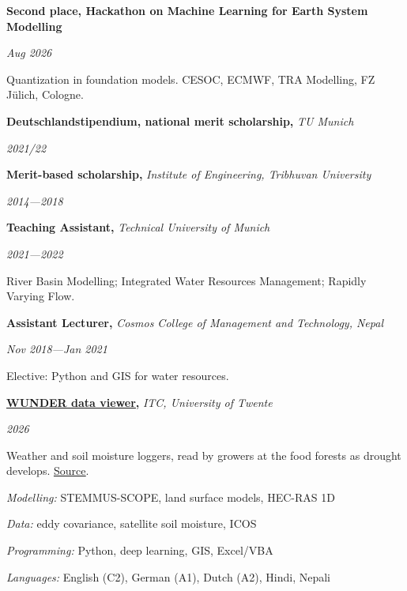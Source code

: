\documentclass[10pt,letterpaper]{article}
\newcommand{\ulink}[2]{\href{#1}{\uline{#2}}}
\newlength{\cvlabelwidth}
\newenvironment{cvsection}[1]{%
  \begin{list}{}{%
    \setlength{\leftmargin}{\cvlabelwidth}%
    \addtolength{\leftmargin}{0.12in}%
    \setlength{\labelwidth}{\cvlabelwidth}%
    \setlength{\labelsep}{0.12in}%
    \setlength{\itemindent}{0pt}%
    \setlength{\listparindent}{0pt}%
    \setlength{\topsep}{0.028in}%
    \setlength{\parsep}{0pt}%
    \setlength{\itemsep}{0pt}%
    \renewcommand{\makelabel}[1]{%
      \smash{\parbox[t]{\cvlabelwidth}{\raggedright\textsc{##1}}}}%
  }%
  \item[#1]%
}{\end{list}}
\newcommand{\entry}[3]{%
  \noindent
  \begin{minipage}[t]{0.72\linewidth}\raggedright\textbf{#1}\textit{#2}\end{minipage}%
  \hfill
  \begin{minipage}[t]{0.26\linewidth}\raggedleft\textit{#3}\end{minipage}%
  \par
}
\newcommand{\detail}[1]{%
  \hspace*{0.55em}\textendash\hspace{0.4em}%
  \parbox[t]{\dimexpr\linewidth-1.75em}{\raggedright #1}\par}
\newcommand{\gap}{\vspace{0.025in}}
\begin{document}
\begin{cvsection}{Awards}
  \entry{Second place, Hackathon on Machine Learning for Earth System Modelling}{}{Aug 2026}
  \detail{Quantization in foundation models. CESOC, ECMWF, TRA Modelling, FZ Jülich, Cologne.}
\end{cvsection}

\begin{cvsection}{Scholarships}
  \entry{Deutschlandstipendium, national merit scholarship, }{TU Munich}{2021/22}
  \gap
  \entry{Merit-based scholarship, }{Institute of Engineering, Tribhuvan University}{2014---2018}
\end{cvsection}

\begin{cvsection}{Teaching}
  \entry{Teaching Assistant, }{Technical University of Munich}{2021---2022}
  \detail{River Basin Modelling; Integrated Water Resources Management; Rapidly Varying Flow.}
  \gap
  \entry{Assistant Lecturer, }{Cosmos College of Management and Technology, Nepal}{Nov 2018---Jan 2021}
  \detail{Elective: Python and GIS for water resources.}
\end{cvsection}

\begin{cvsection}{Software}
  \entry{\ulink{https://wunder-project.streamlit.app}{WUNDER data viewer}, }{ITC, University of Twente}{2026}
  \detail{Weather and soil moisture loggers, read by growers at the food forests as drought develops.
          \ulink{https://github.com/prajzwal08/wunder-project}{Source}.}
\end{cvsection}

\begin{cvsection}{Skills}
  \textit{Modelling:} STEMMUS-SCOPE, land surface models, HEC-RAS 1D\par
  \textit{Data:} eddy covariance, satellite soil moisture, ICOS\par
  \textit{Programming:} Python, deep learning, GIS, Excel/VBA\par
  \textit{Languages:} English (C2), German (A1), Dutch (A2), Hindi, Nepali\par
\end{cvsection}
\end{document}
